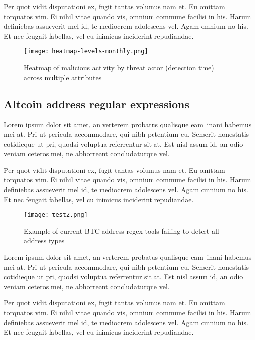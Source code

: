 \documentclass[11pt,fleqn]{book} %
\begin{document}
Per quot vidit disputationi ex, fugit tantas volumus nam et. Eu omittam torquatos vim. Ei nihil vitae quando vis, omnium commune facilisi in his. Harum definiebas assueverit mel id, te mediocrem adolescens vel. Agam omnium no his. Et nec feugait fabellas, vel cu inimicus inciderint repudiandae.

\begin{figure}[h]
    \centering
    \texttt{[image: heatmap-levels-monthly.png]}
    \caption{Heatmap of malicious activity by threat actor (detection time) across multiple attributes}
    \label{fig:awesome_image}
\end{figure}

\subsection{Altcoin address regular expressions}

Lorem ipsum dolor sit amet, an verterem probatus qualisque eam, inani habemus mei at. Pri ut pericula accommodare, qui nibh petentium eu. Senserit honestatis cotidieque ut pri, quodsi voluptua referrentur sit at. Est nisl assum id, an odio veniam ceteros mei, ne abhorreant concludaturque vel.

Per quot vidit disputationi ex, fugit tantas volumus nam et. Eu omittam torquatos vim. Ei nihil vitae quando vis, omnium commune facilisi in his. Harum definiebas assueverit mel id, te mediocrem adolescens vel. Agam omnium no his. Et nec feugait fabellas, vel cu inimicus inciderint repudiandae.

\begin{figure}[h]
    \centering
    \texttt{[image: test2.png]}
    \caption{Example of current BTC address regex tools failing to detect all address types}
    \label{fig:super}
\end{figure}

Lorem ipsum dolor sit amet, an verterem probatus qualisque eam, inani habemus mei at. Pri ut pericula accommodare, qui nibh petentium eu. Senserit honestatis cotidieque ut pri, quodsi voluptua referrentur sit at. Est nisl assum id, an odio veniam ceteros mei, ne abhorreant concludaturque vel.

Per quot vidit disputationi ex, fugit tantas volumus nam et. Eu omittam torquatos vim. Ei nihil vitae quando vis, omnium commune facilisi in his. Harum definiebas assueverit mel id, te mediocrem adolescens vel. Agam omnium no his. Et nec feugait fabellas, vel cu inimicus inciderint repudiandae.
\end{document}
